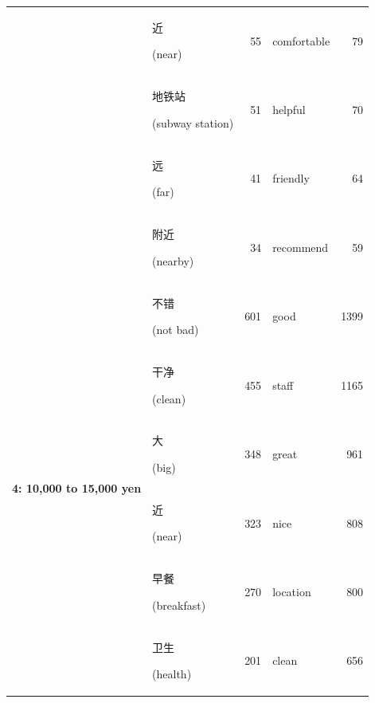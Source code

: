 \documentclass[smallextended,natbib]{svjour3}       %
\begin{document}
\begin{table}[ht]
{\begin{tabular}{|c|lr|lr|}
                                                             & \begin{CJK}{UTF8}{gbsn}近\end{CJK} (near)             & 55    & comfortable & 79    \\  
                                                             & \begin{CJK}{UTF8}{gbsn}地铁站\end{CJK} (subway station) & 51    & helpful     & 70    \\  
                                                             & \begin{CJK}{UTF8}{gbsn}远\end{CJK} (far)              & 41    & friendly    & 64    \\  
                                                             & \begin{CJK}{UTF8}{gbsn}附近\end{CJK} (nearby)          & 34    & recommend   & 59    \\ \hline
        \multirow{10}{*}{\textbf{4: 10,000 to 15,000 yen}}   & \begin{CJK}{UTF8}{gbsn}不错\end{CJK} (not bad)         & 601   & good        & 1399  \\  
                                                             & \begin{CJK}{UTF8}{gbsn}干净\end{CJK} (clean)           & 455   & staff       & 1165  \\  
                                                             & \begin{CJK}{UTF8}{gbsn}大\end{CJK} (big)              & 348   & great       & 961   \\  
                                                             & \begin{CJK}{UTF8}{gbsn}近\end{CJK} (near)             & 323   & nice        & 808   \\  
                                                             & \begin{CJK}{UTF8}{gbsn}早餐\end{CJK} (breakfast)       & 270   & location    & 800   \\  
                                                             & \begin{CJK}{UTF8}{gbsn}卫生\end{CJK} (health)          & 201   & clean       & 656   \\  

\end{tabular}}
\end{table}
\end{document}
